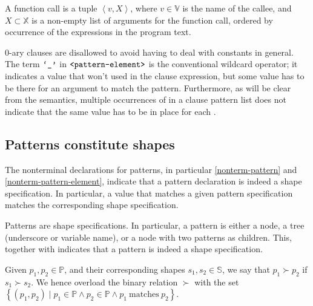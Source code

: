 \begin{definition}\label{definition:function-call} A function call is a tuple
$\left\langle v, X \right\rangle$, where $v\in\mathbb{V}$ is the name of the
callee, and $X\subset\mathbb{X}$ is a non-empty list of arguments for the
function call, ordered by occurrence of the expressions in the program
text.\end{definition}

0-ary clauses are disallowed to avoid having to deal with constants in general.
The term $\text{{\ttfamily`\_'}}$ in $\text{{\ttfamily<pattern-element>}}$ is the conventional
wildcard operator; it indicates a value that won't used in the clause
expression, but some value has to be there for an argument to match the
pattern. Furthermore, as will be clear from the semantics, multiple occurrences
of \term{\_} in a clause pattern list does not indicate that the same value has
to be in place for each \term{\_}. 



\subsection{Patterns constitute shapes}

The nonterminal declarations for patterns, in particular \ref{nonterm-pattern}
and \ref{nonterm-pattern-element}, indicate that a pattern declaration is
indeed a shape specification. In particular, a value that matches a given
pattern specification matches the corresponding shape specification.

\begin{corollary}\label{corollary:pattern-shape} Patterns are shape
specifications. In particular, a pattern is either a node, a tree (underscore
or variable name), or a node with two patterns as children. This, together with
 indicates that a pattern is indeed a shape
specification.\end{corollary}

\begin{definition} Given $p_1,p_2\in\mathbb{P}$, and their corresponding shapes
$s_1,s_2\in\mathbb{S}$, we say that $p_1\succ p_2$ if $s_1\succ s_2$. We hence
overload the binary relation $\succ$ with the set $\left\{(p_1,p_2)\mid
p_1\in\mathbb{P} \wedge p_2\in\mathbb{P} \wedge p_1\ \text{matches}\
p_2\right\}$.\end{definition}

